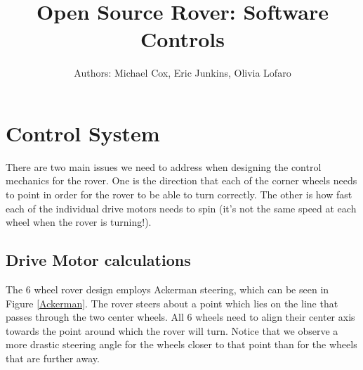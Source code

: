 \documentclass[12pt]{article}
\begin{document}
\title{Open Source Rover: Software Controls}
\author{Authors: Michael Cox, Eric Junkins, Olivia Lofaro}

\makeatletter         
\def\@maketitle{
\begin{center}	
	\makebox[\textwidth][c]{ \texttt{[image: "Pictures/software title".png]}}
	{\Huge \bfseries \sffamily \@title }\\[3ex] 
	{\Large \sffamily \@author}\\[3ex] 
	\texttt{[image: "Pictures/JPL logo".png]}
\end{center}}
\makeatother

\maketitle


\newpage

\tableofcontents

\newpage


\section{Control System}

There are two main issues we need to address when designing the control mechanics for the rover. One is the direction that each of the corner wheels needs to point in order for the rover to be able to turn correctly. The other is how fast each of the individual drive motors needs to spin (it's not the same speed at each wheel when the rover is turning!). 

\subsection{Drive Motor calculations}
The 6 wheel rover design employs Ackerman steering, which can be seen in Figure \ref{Ackerman}. The rover steers about a point which lies on the line that passes through the two center wheels. All 6 wheels need to align their center axis towards the point around which the rover will turn. Notice that we observe a more drastic steering angle for the wheels closer to that point than for the wheels that are further away. 
\end{document}
